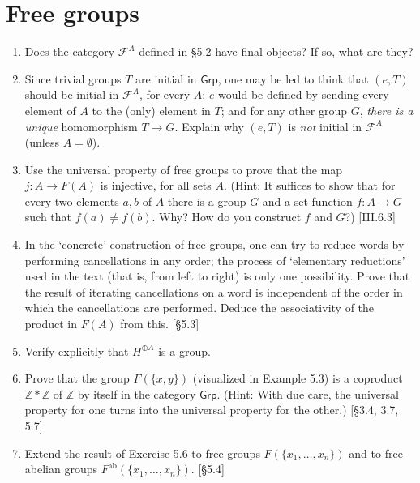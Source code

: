 



\section{Free groups}
\begin{enumerate}
    \item Does the category $\mathscr{F}^A$ defined in \S5.2 have final objects? If so, what are they?

    \item Since trivial groups $T$ are initial in $\mathsf{Grp}$, one may be led to think that $(e, T)$ should be initial in $\mathscr{F}^A$, for every $A$: $e$ would be defined by sending every element of $A$ to the (only) element in $T$; and for any other group $G$, \emph{there is a unique} homomorphism $T \to G$. Explain why $(e, T)$ is \emph{not} initial in $\mathscr{F}^A$ (unless $A = \emptyset$).

    \item Use the universal property of free groups to prove that the map $j: A \to F(A)$ is injective, for all sets $A$. (Hint: It suffices to show that for every two elements $a, b$ of $A$ there is a group $G$ and a set-function $f: A \to G$ such that $f(a) \ne f(b)$. Why? How do you construct $f$ and $G$?) [III.6.3]

    \item In the `concrete' construction of free groups, one can try to reduce words by performing cancellations in any order; the process of `elementary reductions' used in the text (that is, from left to right) is only one possibility. Prove that the result of iterating cancellations on a word is independent of the order in which the cancellations are performed. Deduce the associativity of the product in $F(A)$ from this. [\S5.3]

    \item Verify explicitly that $H^{\oplus A}$ is a group.

    \item Prove that the group $F(\{x, y\})$ (visualized in Example 5.3) is a coproduct $\mathbb{Z} \ast \mathbb{Z}$ of $\mathbb{Z}$ by itself in the category $\mathsf{Grp}$. (Hint: With due care, the universal property for one turns into the universal property for the other.) [\S3.4, 3.7, 5.7]

    \item Extend the result of Exercise 5.6 to free groups $F(\{x_1, \dots, x_n\})$ and to free abelian groups $F^{\text{ab}}(\{x_1, \dots, x_n\})$. [\S5.4]


\end{enumerate}
